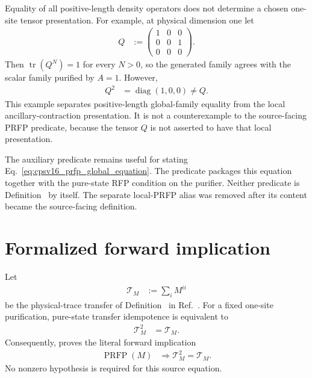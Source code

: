 \documentclass{article}
\begin{document}
Equality of all positive-length density operators does not determine a chosen
one-site tensor presentation. For example, at physical dimension one let
\begin{align}
    Q &:=
    \begin{pmatrix}
        1&0&0\\
        0&0&1\\
        0&0&0
    \end{pmatrix}.
    \label{eq:cpsv16_prfp_nilpotent_global_family_tensor}
\end{align}
Then $\operatorname{tr}(Q^N)=1$ for every $N>0$, so the generated family agrees
with the scalar family purified by $A=1$. However,
\begin{align}
    Q^2 &= \operatorname{diag}(1,0,0) \ne Q.
    \label{eq:cpsv16_prfp_nilpotent_not_idempotent}
\end{align}
This example separates positive-length global-family equality from the local
ancillary-contraction presentation. It is not a counterexample to the
source-facing PRFP predicate, because the tensor $Q$ is not asserted to have
that local presentation.

The auxiliary predicate
 remains useful for stating
Eq.~\eqref{eq:cpsv16_prfp_global_equation}. The predicate
 packages this equation together
with the pure-state RFP condition on the purifier. Neither predicate is
Definition~ by itself. The separate local-PRFP alias was removed after its
content became the source-facing  definition.

\section{Formalized forward implication}

Let
\begin{align}
    \mathcal T_M &:= \sum_i M^{ii}
    \label{eq:cpsv16_prfp_physical_trace_transfer}
\end{align}
be the physical-trace transfer of Definition~ in
Ref.~\cite{Cirac2016MPDO_arXiv}. For a fixed one-site purification, pure-state
transfer idempotence is equivalent to
\begin{align}
    \mathcal T_M^2 &= \mathcal T_M.
    \label{eq:cpsv16_prfp_physical_trace_idempotence}
\end{align}
Consequently,
 proves the literal forward
implication
\begin{align}
    \operatorname{PRFP}(M)
        &\Longrightarrow
        \mathcal T_M^2=\mathcal T_M.
    \label{eq:cpsv16_prfp_forward_implication}
\end{align}
No nonzero hypothesis is required for this source equation.
\end{document}

